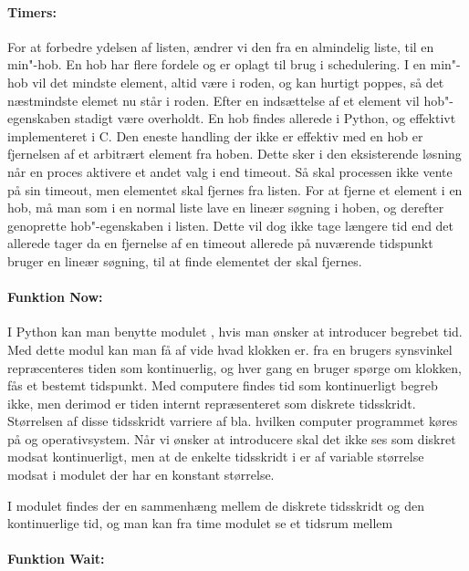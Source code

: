 \paragraph*{Timers:} For at forbedre ydelsen af  listen, ændrer vi den fra en almindelig liste, til en min"-hob. En hob har flere fordele og er oplagt til brug i schedulering. I en min"-hob vil det mindste element, altid være i roden, og kan hurtigt poppes, så det næstmindste elemet nu står i roden. Efter en indsættelse af et element vil hob"-egenskaben stadigt være overholdt. En hob findes allerede i Python, og effektivt implementeret i C. Den eneste handling der ikke er effektiv med en hob er fjernelsen af et arbitrært element fra hoben. Dette sker i den eksisterende løsning når en proces aktivere et andet valg i  end timeout. Så skal processen ikke vente på sin timeout, men elementet skal fjernes fra  listen.  For at fjerne et element i en hob, må man som i en normal liste lave en lineær søgning i hoben, og derefter genoprette hob"-egenskaben i listen. Dette vil dog ikke tage længere tid end det allerede tager da en fjernelse af en timeout allerede på nuværende tidspunkt bruger en lineær søgning, til at finde elementet der skal fjernes. 


\paragraph*{Funktion Now:}
I Python kan man benytte modulet , hvis man ønsker at introducer begrebet tid. Med dette modul kan man få af vide hvad klokken er. fra en brugers synsvinkel repræcenteres tiden som kontinuerlig, og hver gang en bruger spørge om klokken, fås et bestemt tidspunkt. Med computere findes tid som kontinuerligt begreb ikke, men derimod er tiden internt repræsenteret som diskrete tidsskridt. Størrelsen af disse tidsskridt varriere af bla. hvilken computer programmet køres på og operativsystem. Når vi ønsker at introducere \des skal det ikke ses som diskret modsat kontinuerligt, men at de enkelte tidsskridt i \des er af variable størrelse modsat i modulet  der har en konstant størrelse. 

I  modulet findes der en sammenhæng mellem de diskrete tidsskridt og den kontinuerlige tid, og man kan fra time modulet se et tidsrum mellem 

\paragraph*{Funktion Wait:}

